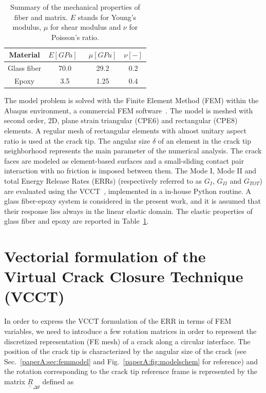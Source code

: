 \begin{table}[!htbp]
 \centering
 \caption{Summary of the mechanical properties of fiber and matrix. $E$ stands for Young's modulus, $\mu$ for shear modulus and $\nu$ for Poisson's ratio.}
 \begin{tabular}{cccc}
\\
\textbf{Material} & \textbf{$E\left[GPa\right]$}\ & \textbf{$\mu\left[GPa\right]$} & \textbf{$\nu\left[-\right]$} \\
\midrule
Glass fiber    & 70.0  & 29.2   & 0.2  \\
Epoxy    & 3.5    & 1.25   & 0.4
\end{tabular}
\label{paperA:tab:phaseprop}
\end{table}

The model problem is solved with the Finite Element Method (FEM) within the Abaqus environment, a commercial FEM software~\cite{abq12}. The model is meshed with second order, 2D, plane strain triangular (CPE6) and rectangular (CPE8) elements. A regular mesh of rectangular elements with almost unitary aspect ratio is used at the crack tip. The angular size $\delta$ of an element in the crack tip neighborhood represents the main parameter of the numerical analysis. The crack faces are modeled as element-based surfaces and a small-sliding contact pair interaction with no friction is imposed between them. The Mode I, Mode II and total Energy Release Rates (ERRs) (respectively referred to as $G_{I}$, $G_{II}$ and $G_{TOT}$) are evaluated using the VCCT~\cite{Krueger2004}, implemented in a in-house Python routine. A glass fiber-epoxy system is considered in the present work, and it is assumed that their response lies always in the linear elastic domain. The elastic properties of glass fiber and epoxy are reported in Table~\ref{paperA:tab:phaseprop}.

\section{Vectorial formulation of the Virtual Crack Closure Technique (VCCT)}

In order to express the VCCT formulation of the ERR in terms of FEM variables, we need to introduce a few rotation matrices in order to represent the discretized representation (FE mesh) of a crack along a circular interface. The position of the crack tip is characterized by the angular size of the crack (see Sec.~\ref{paperA:sec:femmodel} and Fig.~\ref{paperA:fig:modelschem} for reference) and the rotation corresponding to the crack tip reference frame is represented by the matrix $\underline{\underline{R}}_{\Delta\theta}$ defined as

